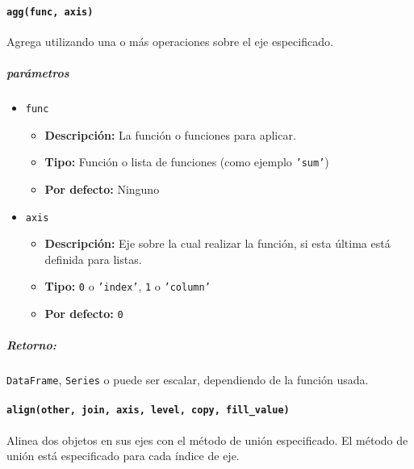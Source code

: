 \paragraph{\texttt{agg(func, axis)}} Agrega utilizando una o más operaciones
sobre el eje especificado.
\subparagraph{\textbf{parámetros}}
\begin{itemize}
    \item \texttt{func}
          \begin{itemize}
              \item \textbf{Descripción:} La función o funciones para aplicar.
              \item \textbf{Tipo:} Función o lista de funciones (como ejemplo
                    \texttt{'sum'})
              \item \textbf{Por defecto:} Ninguno
          \end{itemize}
    \item \texttt{axis}
          \begin{itemize}
              \item \textbf{Descripción:} Eje sobre la cual realizar la
                    función, si esta última está definida para listas.
              \item \textbf{Tipo:} \texttt{0} o \texttt{'index'}, \texttt{1} o
                    \texttt{'column'}
              \item \textbf{Por defecto:} \texttt{0}
          \end{itemize}
\end{itemize}
\subparagraph{Retorno:} \texttt{DataFrame}, \texttt{Series} o puede ser
escalar, dependiendo de la función usada.

\paragraph{\texttt{align(other, join, axis, level, copy, fill\_value)}}
Alinea dos objetos en sus ejes con el método de unión especificado. El método
de unión está especificado para cada índice de eje.

